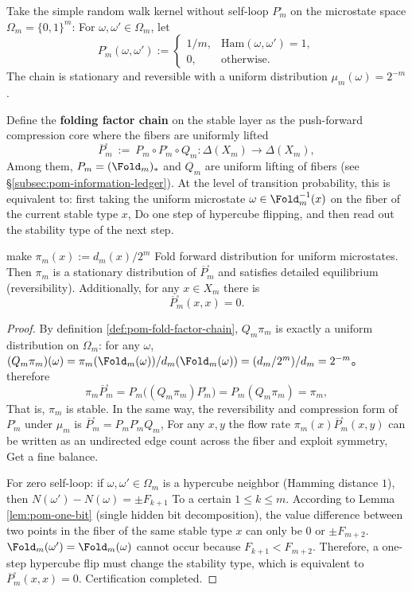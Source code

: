 \begin{definition}\label{def:pom-fold-factor-chain}
Take the simple random walk kernel without self-loop \(P^{\square}_m\) on the microstate space \(\Omega_m=\{0,1\}^m\):
For \(\omega,\omega'\in\Omega_m\), let
\[
P^{\square}_m(\omega,\omega')
:=
\begin{cases}
1/m,& \mathrm{Ham}(\omega,\omega')=1,\\
0,& \text{otherwise}.
\end{cases}
\]
The chain is stationary and reversible with a uniform distribution \(\mu_m(\omega)=2^{-m}\).
\par
Define the \textbf{folding factor chain} on the stable layer as the push-forward compression core where the fibers are uniformly lifted
\[
\overline P^{\square}_m\ :=\ P_m\circ P^{\square}_m\circ Q_m:\Delta(X_m)\to\Delta(X_m),
\]
Among them, \(P_m=(\Fold_m)_*\) and \(Q_m\) are uniform lifting of fibers (see \S\ref{subsec:pom-information-ledger}).
At the level of transition probability, this is equivalent to: first taking the uniform microstate \(\omega\in\Fold_m^{-1}(x)\) on the fiber of the current stable type \(x\),
Do one step of hypercube flipping, and then read out the stability type of the next step.
\end{definition}

\begin{proposition}\label{prop:pom-fold-factor-chain-reversible-noloop}
make
\(
\pi_m(x):=d_m(x)/2^m
\)
Fold forward distribution for uniform microstates.
Then \(\pi_m\) is a stationary distribution of \(\overline P^{\square}_m\) and satisfies detailed equilibrium (reversibility).
Additionally, for any \(x\in X_m\) there is
\[
\overline P^{\square}_m(x,x)=0.
\]
\end{proposition}
\begin{proof}
By definition \ref{def:pom-fold-factor-chain},
\(
Q_m\pi_m
\)
is exactly a uniform distribution on \(\Omega_m\): for any \(\omega\),
\(
(Q_m\pi_m)(\omega)=\pi_m(\Fold_m(\omega))/d_m(\Fold_m(\omega))=(d_m/2^m)/d_m=2^{-m}
\)。
therefore
\[
\pi_m\overline P^{\square}_m
=
P_m\bigl((Q_m\pi_m)P^{\square}_m\bigr)
=
P_m(Q_m\pi_m)
=\pi_m,
\]
That is, \(\pi_m\) is stable.
In the same way, the reversibility and compression form of \(P^{\square}_m\) under \(\mu_m\) is \(\overline P^{\square}_m=P_mP^{\square}_mQ_m\),
For any \(x,y\) the flow rate \(\pi_m(x)\overline P^{\square}_m(x,y)\) can be written as an undirected edge count across the fiber and exploit symmetry,
Get a fine balance.
\par
For zero self-loop: if \(\omega,\omega'\in\Omega_m\) is a hypercube neighbor (Hamming distance \(1\)), then
\(
N(\omega')-N(\omega)=\pm F_{k+1}
\)
To a certain \(1\le k\le m\).
According to Lemma \ref{lem:pom-one-bit} (single hidden bit decomposition), the value difference between two points in the fiber of the same stable type \(x\) can only be \(0\) or \(\pm F_{m+2}\).
\(\Fold_m(\omega')=\Fold_m(\omega)\) cannot occur because \(F_{k+1}<F_{m+2}\).
Therefore, a one-step hypercube flip must change the stability type, which is equivalent to \(\overline P^{\square}_m(x,x)=0\). Certification completed.
\end{proof}

